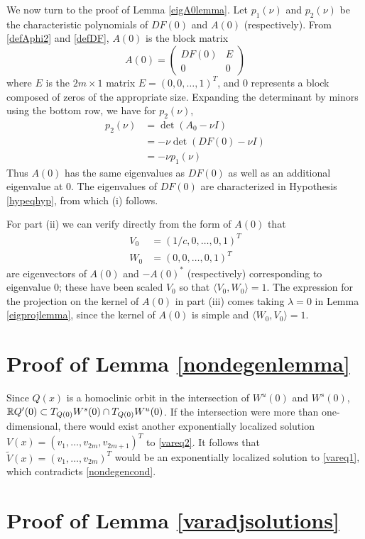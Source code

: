\documentclass[thesis.tex]{subfiles}
\begin{document}
We now turn to the proof of Lemma \ref{eigA0lemma}. Let $p_1(\nu)$ and $p_2(\nu)$ be the characteristic polynomials of $DF(0)$ and $A(0)$ (respectively). From \eqref{defAphi2} and \eqref{defDF}, $A(0)$ is the block matrix
\[
A(0) = \begin{pmatrix}
DF(0) & E \\
0 & 0
\end{pmatrix}
\]
where $E$ is the $2m \times 1$ matrix $E = (0, 0, \dots, 1)^T$, and $0$ represents a block composed of zeros of the appropriate size. Expanding the determinant by minors using the bottom row, we have for $p_2(\nu)$,
\begin{align*}
p_2(\nu) &= \det(A_0 - \nu I) \\
&= -\nu \det(DF(0) - \nu I) \\
&= -\nu p_1(\nu)
\end{align*}
Thus $A(0)$ has the same eigenvalues as $DF(0)$ as well as an additional eigenvalue at 0. The eigenvalues of $DF(0)$ are characterized in Hypothesis \ref{hypeqhyp}, from which (i) follows.

For part (ii) we can verify directly from the form of $A(0)$ that 
\begin{align*}
V_0 &= (1/c, 0, \dots, 0, 1)^T \\
W_0 &= (0, 0, \dots, 0, 1)^T
\end{align*}
are eigenvectors of $A(0)$ and $-A(0)^*$ (respectively) corresponding to eigenvalue 0; these have been scaled $V_0$ so that $\langle V_0, W_0 \rangle = 1$. The expression for the projection on the kernel of $A(0)$ in part (iii) comes taking $\lambda = 0$ in Lemma \ref{eigprojlemma}, since the kernel of $A(0)$ is simple and $\langle W_0, V_0 \rangle = 1$.

\section{Proof of Lemma \ref{nondegenlemma}}
Since $Q(x)$ is a homoclinic orbit in the intersection of $W^u(0)$ and $W^s(0)$, $\mathbb{R} Q'(0) \subset T_{Q(0)}W^s(0) \cap T_{Q(0)}W^u(0)$. If the intersection were more than one-dimensional, there would exist another exponentially localized solution $V(x) = (v_1, \dots, v_{2m}, v_{2m+1})^T$ to \eqref{vareq2}. It follows that $\tilde{V}(x) = (v_1, \dots, v_{2m})^T$ would be an exponentially localized solution to \eqref{vareq1}, which contradicts \eqref{nondegencond}.

\section{Proof of Lemma \ref{varadjsolutions}}
\end{document}
